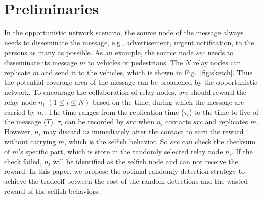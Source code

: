 \section{Preliminaries}
\label{sec:preli}
In the opportunistic network scenario,
the source node of the message always needs to 
disseminate the message, e.g., advertisement, urgent notification,
to the persons as many as possible.
As an example, the source node $src$ 
needs to disseminate its message $m$
to vehicles or pedestrians.
The $N$ relay nodes can replicate $m$
and send it to the vehicles,
which is shown in Fig.~\ref{fig:sketch}.
Thus the potential coverage area of the message
can be broadened by the opportunistic network.
To encourage the collaboration of relay nodes,
$src$ should reward the relay node $n_{i}$
$(1 \le i \le N)$ based on the time,
during which the message are carried by $n_{i}$.
The time ranges from the replication time ($\tau_{i}$)
to the time-to-live of the message ($T$).
$\tau_{i}$ can be recorded by $src$ when
$n_{i}$ contacts $src$ and replicates $m$.
However, $n_{i}$ may discard $m$ immediately after the contact
to earn the reward without carrying $m$,
which is the selfish behavior.
So $src$ can check the checksum of $m$'s specific part,
which is store in the randomly selected relay node $n_{i}$.
If the check failed,
$n_{i}$ will be identified as the selfish node
and can not receive the reward.
In this paper, we propose the optimal randomly detection strategy
to achieve the tradeoff between
the cost of the random detections and
the wasted reward of the selfish behaviors.

